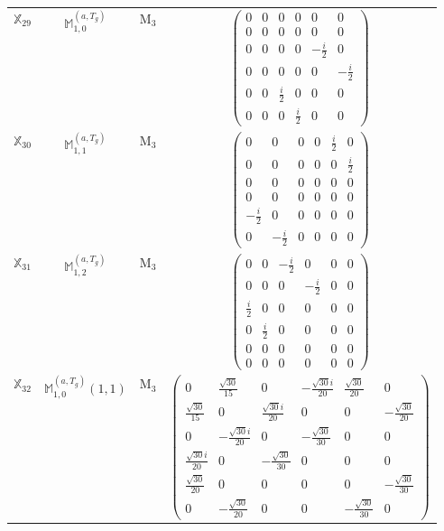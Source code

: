 \documentclass[fleqn,10pt,landscape]{article}
\begin{document}
\begin{itemize}
\begin{center}
\begin{longtable}{c|c|c|c}
$ \mathbb{X}_{29} $ & $\mathbb{M}_{1,0}^{(a,T_{g})}$ & M$_{3}$ & $\begin{pmatrix} 0 & 0 & 0 & 0 & 0 & 0 \\ 0 & 0 & 0 & 0 & 0 & 0 \\ 0 & 0 & 0 & 0 & - \frac{i}{2} & 0 \\ 0 & 0 & 0 & 0 & 0 & - \frac{i}{2} \\ 0 & 0 & \frac{i}{2} & 0 & 0 & 0 \\ 0 & 0 & 0 & \frac{i}{2} & 0 & 0 \end{pmatrix}$ \\
$ \mathbb{X}_{30} $ & $\mathbb{M}_{1,1}^{(a,T_{g})}$ & M$_{3}$ & $\begin{pmatrix} 0 & 0 & 0 & 0 & \frac{i}{2} & 0 \\ 0 & 0 & 0 & 0 & 0 & \frac{i}{2} \\ 0 & 0 & 0 & 0 & 0 & 0 \\ 0 & 0 & 0 & 0 & 0 & 0 \\ - \frac{i}{2} & 0 & 0 & 0 & 0 & 0 \\ 0 & - \frac{i}{2} & 0 & 0 & 0 & 0 \end{pmatrix}$ \\
$ \mathbb{X}_{31} $ & $\mathbb{M}_{1,2}^{(a,T_{g})}$ & M$_{3}$ & $\begin{pmatrix} 0 & 0 & - \frac{i}{2} & 0 & 0 & 0 \\ 0 & 0 & 0 & - \frac{i}{2} & 0 & 0 \\ \frac{i}{2} & 0 & 0 & 0 & 0 & 0 \\ 0 & \frac{i}{2} & 0 & 0 & 0 & 0 \\ 0 & 0 & 0 & 0 & 0 & 0 \\ 0 & 0 & 0 & 0 & 0 & 0 \end{pmatrix}$ \\
$ \mathbb{X}_{32} $ & $\mathbb{M}_{1,0}^{(a,T_{g})}(1,1)$ & M$_{3}$ & $\begin{pmatrix} 0 & \frac{\sqrt{30}}{15} & 0 & - \frac{\sqrt{30} i}{20} & \frac{\sqrt{30}}{20} & 0 \\ \frac{\sqrt{30}}{15} & 0 & \frac{\sqrt{30} i}{20} & 0 & 0 & - \frac{\sqrt{30}}{20} \\ 0 & - \frac{\sqrt{30} i}{20} & 0 & - \frac{\sqrt{30}}{30} & 0 & 0 \\ \frac{\sqrt{30} i}{20} & 0 & - \frac{\sqrt{30}}{30} & 0 & 0 & 0 \\ \frac{\sqrt{30}}{20} & 0 & 0 & 0 & 0 & - \frac{\sqrt{30}}{30} \\ 0 & - \frac{\sqrt{30}}{20} & 0 & 0 & - \frac{\sqrt{30}}{30} & 0 \end{pmatrix}$ \\

\end{longtable}
\end{center}
\end{itemize}
\end{document}
